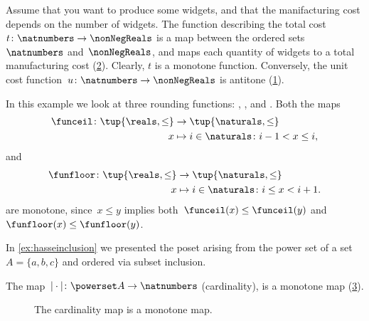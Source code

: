 \begin{example}
    Assume that you want to produce some widgets, and that the manifacturing cost depends on the number of widgets.
    The function describing the total cost~$t\colon \natnumbers\to \nonNegReals$ is a map between the ordered sets~$\natnumbers$ and~$\nonNegReals$, and maps each quantity of widgets to a total manufacturing cost (\cref{fig:total_manufacturing}).
    Clearly, $t$ is a monotone function.
    Conversely, the unit cost function~$u\colon \natnumbers\to \nonNegReals$ is antitone (\cref{fig:unit_manufacturing}).
\end{example}

\begin{figure}[h!]
    \caption{}
    \label{fig:unit_manufacturing}
\end{figure}

\begin{figure}[h!]
    \caption{}
    \label{fig:total_manufacturing}
\end{figure}





\begin{example}
    In this example we look at three rounding functions: \funceil, \funfloor, and \rtntte. Both the maps
    \begin{equation*}
        \begin{aligned}
            \funceil\colon \tup{\reals,\leq}&\to \tup{\naturals,\leq}\\
            x&\mapsto i \in \naturals \colon i-1<x\leq i,
        \end{aligned}
    \end{equation*}
and
    \begin{equation*}
        \begin{aligned}
            \funfloor\colon \tup{\reals,\leq}&\to \tup{\naturals,\leq}\\
            x&\mapsto i \in \naturals \colon i\leq x< i+1.
        \end{aligned}
    \end{equation*}
    are monotone, since~$x\leq y$ implies both~$\funceil(x)\leq \funceil(y)$ and~$\funfloor(x)\leq\funfloor(y)$.
\end{example}

\begin{example}
    In \cref{ex:hasseinclusion} we presented the poset arising from the power set of a set~$A=\{a,b,c\}$ and ordered via subset inclusion.

    The map~$\vert \cdot \vert \colon \powerset A \to \natnumbers$ (cardinality), is a monotone map (\cref{fig:cardinality}).
    \begin{figure}[h!]
        \begin{center}
        \end{center}
        \caption{The cardinality map is a monotone map. \label{fig:cardinality}}
    \end{figure}
\end{example}

